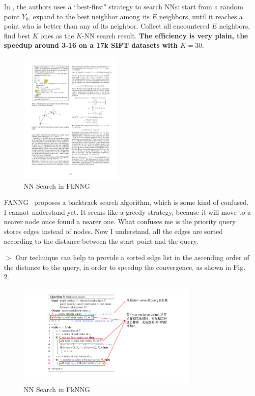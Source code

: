 \documentclass{article} %
\begin{document}
In \cite{KianaFkNNG2011IJCAI}, the authors uses a ``best-first" strategy to search NNs: start from a random point $Y_0$, expand to the best neighbor among its $E$ neighbors, until it reaches a point who is better than any of its neighbor. Collect all encountered $E$ neighbors, find best $K$ ones as the $K$-NN search result. \textbf{The efficiency is very plain, the speedup around 3-16 on a 17k SIFT datasets with $K=30$}. 
\begin{figure}
	\centering
	\includegraphics[width=0.45\textwidth]{search_FkNNG.pdf}
	\caption{NN Search in FkNNG}\label{fig:search_fknng}
\end{figure}


FANNG~\cite{HarwoodD2016FANNG} proposes a backtrack search algorithm, which is some kind of confused, I cannot understand yet. It seems like a greedy strategy, because it will move to a nearer node once found a nearer one. What confuses me is the priority query stores edges instead of nodes. Now I understand, all the edges are sorted according to the distance between the start point and the query.

$>$ Our technique can help to provide a sorted edge list in the ascending order of the distance to the query, in order to speedup the convergence, as shown in Fig. \ref{fig:search_backtrack}. 
\begin{figure}
	\centering
	\includegraphics[width=0.8\textwidth]{search_backtrack.pdf}
	\caption{NN Search in FkNNG}\label{fig:search_backtrack}
\end{figure}
\end{document}

